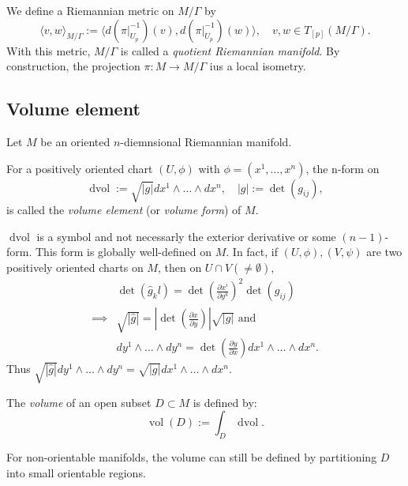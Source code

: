 We define a Riemannian metric on $M/\Gamma$ by
\[
\langle v, w \rangle_{M/\Gamma} := \langle d(\pi|_{U_p}^{-1})(v), d(\pi|_{U_p}^{-1})(w) \rangle, \quad v,w \in T_{[p]}(M/\Gamma).
\]
With this metric, $M/\Gamma$ is called a \emph{quotient Riemannian manifold}.
By construction, the projection $\pi:M\to M/\Gamma$ ius a local isometry.

\subsection{Volume element}

Let $M$ be an oriented $n$-diemnsional Riemannian manifold.
\begin{definition}
For a positively oriented chart $(U, \phi)$ with $\phi = (x^1, \dots, x^n)$, the n-form on
\[
\operatorname{dvol} := \sqrt{|g|}dx^1 \wedge \dots \wedge dx^n, \quad |g| := \operatorname{det}(g_{ij}),
\]
is called the \emph{volume element} (or \emph{volume form}) of $M$. 
\end{definition}

\begin{remark}
$\operatorname{dvol}$ is a symbol and not necessarly the exterior derivative or some $(n-1)$-form.
This form is globally well-defined on $M$.
In fact, if $(U,\phi), (V,\psi)$ are two positively oriented charts on $M$, then on $U\cap V(\neq \emptyset)$,
\[
\begin{aligned}
&\operatorname{det}(\hat{g}_kl) = \operatorname{det}\left(\frac{\partial x^i}{\partial y^k}\right)^2 \operatorname{det}(g_{ij}) \\
\implies &\sqrt{|\hat{g}|} = \left|\operatorname{det}\left(\frac{\partial x}{\partial y}\right)\right| \sqrt{|g|} \text{ and} \\
& dy^1 \wedge \dots \wedge dy^n = \operatorname{det}\left(\frac{\partial y}{\partial x}\right) dx^1 \wedge \dots \wedge dx^n.
\end{aligned}
\]
Thus $\sqrt{|\hat{g}|} dy^1 \wedge \dots \wedge dy^n = \sqrt{|g|} dx^1 \wedge \dots \wedge dx^n$.
\end{remark}

\begin{definition}[Volume]
The \emph{volume} of an open subset $D \subset M$ is defined by:
\[
\operatorname{vol}(D) := \int_D \operatorname{dvol}.
\]
\end{definition}

\begin{remark}
For non-orientable manifolds, the volume can still be defined by partitioning $D$ into small orientable regions.
\end{remark}